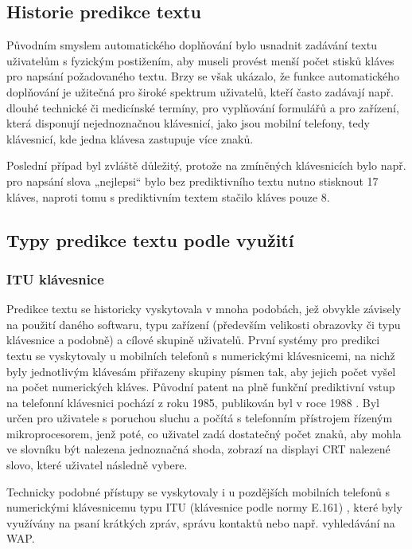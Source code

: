 \documentclass{article}
\begin{document}
\subsection{Historie predikce textu}

Původním smyslem automatického doplňování bylo usnadnit zadávání textu uživatelům s fyzickým postižením, aby museli provést menší počet stisků kláves pro napsání požadovaného textu. Brzy se však ukázalo, že funkce automatického doplňování je užitečná pro široké spektrum uživatelů, kteří často zadávají např. dlouhé technické či medicínské termíny, pro vyplňování formulářů a pro zařízení, která disponují nejednoznačnou klávesnicí, jako jsou mobilní telefony, tedy klávesnicí, kde jedna klávesa zastupuje více znaků. 

Poslední případ byl zvláště důležitý, protože na zmíněných klávesnicích bylo např. pro napsání slova „nejlepsi“ bylo bez prediktivního textu nutno stisknout 17 kláves, naproti tomu s prediktivním textem stačilo kláves pouze 8. \cite{dXVv6nPb2KifFXYv}

\subsection{Typy predikce textu podle využití}

\subsubsection{ITU klávesnice}

Predikce textu se historicky vyskytovala v mnoha podobách, jež obvykle závisely na použití daného softwaru, typu zařízení (především velikosti obrazovky či typu klávesnice a podobně) a cílové skupině uživatelů. První systémy pro predikci textu se vyskytovaly u mobilních telefonů s numerickými klávesnicemi, na nichž byly jednotlivým klávesám přiřazeny skupiny písmen tak, aby jejich počet vyšel na počet numerických kláves. Původní patent na plně funkční prediktivní vstup na telefonní klávesnici pochází z roku 1985, publikován byl v roce 1988 \cite{Feinson1988}. Byl určen pro uživatele s poruchou sluchu a počítá s telefonním přístrojem řízeným mikroprocesorem, jenž poté, co uživatel zadá dostatečný počet znaků, aby mohla ve slovníku být nalezena jednoznačná shoda, zobrazí na displayi CRT nalezené slovo, které uživatel následně vybere.

Technicky podobné přístupy se vyskytovaly i u pozdějších mobilních telefonů s numerickými klávesnicemu typu ITU (klávesnice podle normy E.161) \cite{mfmtlqoxL48pMk3T}, které byly využívány na psaní krátkých zpráv, správu kontaktů nebo např. vyhledávání na WAP. 
\end{document}

